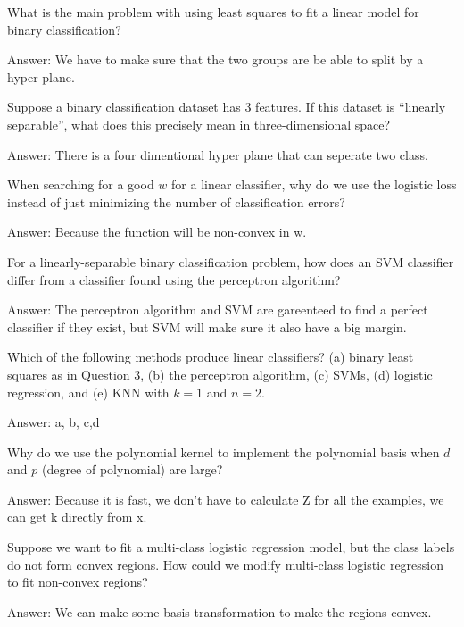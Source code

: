 \documentclass{article}
\def\ans#1{\par\gre{Answer: #1}}
\def\gre#1{{\color{gre}#1}}
\begin{document}
{\item What is the main problem with using least squares to fit a linear model for binary classification? \ans{We have to make sure that the two groups are be able to split by a hyper plane.}
\item Suppose a binary classification dataset has 3 features. If this dataset is ``linearly separable'', what does this precisely mean in three-dimensional space? \ans{There is a four dimentional hyper plane that can seperate two class.}
\item When searching for a good $w$ for a linear classifier, why do we use the logistic loss instead of just minimizing the number of classification errors? \ans{Because the function will be non-convex in w.}
\item For a linearly-separable binary classification problem, how does an SVM classifier differ from a classifier found using the perceptron algorithm? \ans{The perceptron algorithm and SVM are gareenteed to find a perfect classifier if they exist, but SVM will make sure it also have a big margin.}
\item Which of the following methods produce linear classifiers? (a) binary least squares as in Question 3, (b) the perceptron algorithm, (c) SVMs, (d) logistic regression, and (e) KNN with $k=1$ and $n=2$. \ans{a, b, c,d}
\item Why do we use the polynomial kernel to implement the polynomial basis when $d$ and $p$ (degree of polynomial) are large? \ans{Because it is fast, we don't have to calculate Z for all the examples, we can get k directly from x.}
\item Suppose we want to fit a multi-class logistic regression model, but the class labels do not form convex regions. How could we modify multi-class logistic regression to fit non-convex regions? \ans{We can make some basis transformation to make the regions convex.}
}
\end{document}
